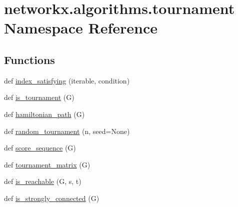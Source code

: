 \hypertarget{namespacenetworkx_1_1algorithms_1_1tournament}{}\section{networkx.\+algorithms.\+tournament Namespace Reference}
\label{namespacenetworkx_1_1algorithms_1_1tournament}
\subsection*{Functions}
\begin{DoxyCompactItemize}
\item 
def \hyperlink{namespacenetworkx_1_1algorithms_1_1tournament_ab9bfdfdd0a78f649c7aa5df464eca01c}{index\+\_\+satisfying} (iterable, condition)
\item 
def \hyperlink{namespacenetworkx_1_1algorithms_1_1tournament_ab7af5e6b1f7adca3f88ebdba688bfa32}{is\+\_\+tournament} (G)
\item 
def \hyperlink{namespacenetworkx_1_1algorithms_1_1tournament_afddc5b951e3fc5c0c168ccc59d22dc13}{hamiltonian\+\_\+path} (G)
\item 
def \hyperlink{namespacenetworkx_1_1algorithms_1_1tournament_ad7bd679c817dc73450fc323ed6229ca0}{random\+\_\+tournament} (n, seed=None)
\item 
def \hyperlink{namespacenetworkx_1_1algorithms_1_1tournament_af22537a4c3e27c60abf92e5ab0dded40}{score\+\_\+sequence} (G)
\item 
def \hyperlink{namespacenetworkx_1_1algorithms_1_1tournament_a70eda0ba7f3f278d7c976752855d0c3c}{tournament\+\_\+matrix} (G)
\item 
def \hyperlink{namespacenetworkx_1_1algorithms_1_1tournament_a28a915c326ebe1518ca9117308c2f2ce}{is\+\_\+reachable} (G, s, t)
\item 
def \hyperlink{namespacenetworkx_1_1algorithms_1_1tournament_a2e02266052eea4c0359eec64b9b9f694}{is\+\_\+strongly\+\_\+connected} (G)
\end{DoxyCompactItemize}


